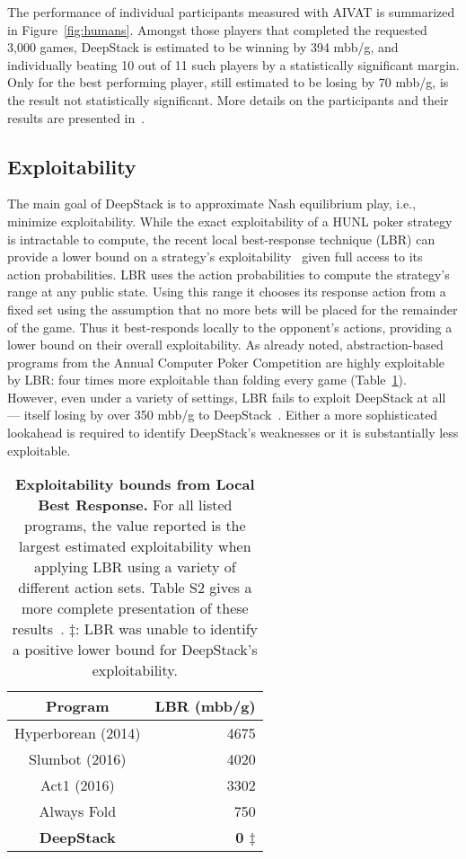 \documentclass[12pt]{article}
\newif\iffinal
\newcommand{\HUNL}{{HUNL}}
\begin{document}
The performance of individual participants measured with AIVAT is summarized in Figure~\ref{fig:humans}.
Amongst those players that completed the requested 3,000 games, DeepStack is estimated to be winning by 394 mbb/g, and individually beating 10 out of 11 such players by a statistically significant margin.  Only for the best performing player, still estimated to be losing by 70 mbb/g, is the result not statistically significant.
More details on the participants and their results are presented in~\cite{SOM}.

\subsection*{Exploitability}

The main goal of DeepStack is to approximate Nash equilibrium play, i.e., minimize exploitability.
While the exact exploitability of a \HUNL{} poker strategy is intractable to compute, the recent local best-response technique (LBR) can provide a lower bound on a strategy's exploitability~\cite{Lisy17:LocalBR} given full access to its action probabilities.  LBR uses the action probabilities to compute the strategy's range at any public state.  Using this range it chooses its response action from a fixed set using the  assumption that no more bets will be placed for the remainder of the game.  Thus it best-responds locally to the opponent's actions, providing a lower bound on their overall exploitability.  As already noted, abstraction-based programs from the Annual Computer Poker Competition are highly exploitable by LBR: four times more exploitable than folding every game (Table~\ref{tab-localbr-abbrev}).  However, even under a variety of settings, LBR fails to exploit DeepStack at all --- itself losing by over 350 mbb/g to DeepStack~\cite{SOM}.  Either a more sophisticated lookahead is required to identify DeepStack's weaknesses or it is substantially less exploitable. 

\iffinal\else
\begin{table}
\centering
\caption{%
{\bf Exploitability bounds from Local Best Response.}  For all listed programs, the value reported is the largest estimated exploitability when applying LBR using a variety of different action sets.  Table S2 gives a more complete presentation of these results~\cite{SOM}.  $\ddagger$: LBR was unable to identify a positive lower bound for DeepStack's exploitability.%
}
\label{tab-localbr-abbrev}
\begin{tabular}{c|r}
\toprule
Program & LBR (mbb/g) \\
\midrule
Hyperborean (2014) & 4675 \\
Slumbot (2016) & 4020 \\
Act1 (2016) & 3302 \\
Always Fold & 750 \\
\midrule
{\bf DeepStack} & 
{\bf 0 $\ddagger$} \\
\bottomrule
\end{tabular}
\end{table}
\fi
\end{document}
